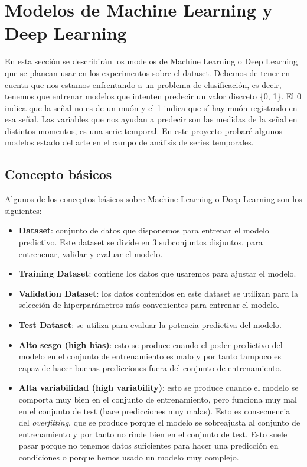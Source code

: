 \section{Modelos de Machine Learning y Deep Learning}

En esta sección se describirán los modelos de Machine Learning o Deep Learning que se planean usar en los experimentos sobre el dataset. Debemos de tener en cuenta que nos estamos enfrentando a un problema de clasificación, es decir, tenemos que entrenar modelos que intenten predecir un valor discreto \{0, 1\}. El 0 indica que la señal no es de un muón y el 1 indica que sí hay muón registrado en esa señal. Las variables que nos ayudan a predecir son las medidas de la señal en distintos momentos, es una serie temporal. En este proyecto probaré algunos modelos estado del arte en el campo de análisis de series temporales.

\subsection{Concepto básicos}

Algunos de los conceptos básicos sobre Machine Learning o Deep Learning son los siguientes:

\begin{itemize}
	\item \textbf{Dataset}: conjunto de datos que disponemos para entrenar el modelo predictivo. Este dataset se divide en 3 subconjuntos disjuntos, para entrenenar, validar y evaluar el modelo.
	\item \textbf{Training Dataset}: contiene los datos que usaremos para ajustar el modelo.
	\item \textbf{Validation Dataset}: los datos contenidos en este dataset se utilizan para la selección de hiperparámetros más convenientes para entrenar el modelo.
	\item \textbf{Test Dataset}: se utiliza para evaluar la potencia predictiva del modelo.
	\item \textbf{Alto sesgo (high bias)}: esto se produce cuando el poder predictivo del modelo en el conjunto de entrenamiento es malo y por tanto tampoco es capaz de hacer buenas predicciones fuera del conjunto de entrenamiento.
	\item \textbf{Alta variabilidad (high variability)}: esto se produce cuando el modelo se comporta muy bien en el conjunto de entrenamiento, pero funciona muy mal en el conjunto de test (hace predicciones muy malas). Esto es consecuencia del \textit{overfitting}, que se produce porque el modelo se sobreajusta al conjunto de entrenamiento y por tanto no rinde bien en el conjunto de test. Esto suele pasar porque no tenemos datos suficientes para hacer una predicción en condiciones o porque hemos usado un modelo muy complejo.
\end{itemize}

